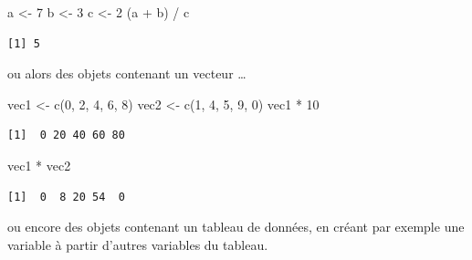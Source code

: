 \documentclass[
  letterpaper,
]{book}
\newenvironment{Shaded}{\begin{snugshade}}{\end{snugshade}}
\newcommand{\DecValTok}[1]{\textcolor[rgb]{0.68,0.00,0.00}{#1}}
\newcommand{\FunctionTok}[1]{\textcolor[rgb]{0.28,0.35,0.67}{#1}}
\newcommand{\NormalTok}[1]{\textcolor[rgb]{0.00,0.23,0.31}{#1}}
\newcommand{\OtherTok}[1]{\textcolor[rgb]{0.00,0.23,0.31}{#1}}
\newcommand{\SpecialCharTok}[1]{\textcolor[rgb]{0.37,0.37,0.37}{#1}}
\begin{document}
\begin{Shaded}
\begin{Highlighting}[]
\NormalTok{a }\OtherTok{\textless{}{-}} \DecValTok{7}
\NormalTok{b }\OtherTok{\textless{}{-}} \DecValTok{3}
\NormalTok{c }\OtherTok{\textless{}{-}} \DecValTok{2}
\NormalTok{(a }\SpecialCharTok{+}\NormalTok{ b) }\SpecialCharTok{/}\NormalTok{ c}
\end{Highlighting}
\end{Shaded}

\begin{verbatim}
[1] 5
\end{verbatim}

ou alors des objets contenant un vecteur \ldots{}

\begin{Shaded}
\begin{Highlighting}[]
\NormalTok{vec1 }\OtherTok{\textless{}{-}} \FunctionTok{c}\NormalTok{(}\DecValTok{0}\NormalTok{, }\DecValTok{2}\NormalTok{, }\DecValTok{4}\NormalTok{, }\DecValTok{6}\NormalTok{, }\DecValTok{8}\NormalTok{)}
\NormalTok{vec2 }\OtherTok{\textless{}{-}} \FunctionTok{c}\NormalTok{(}\DecValTok{1}\NormalTok{, }\DecValTok{4}\NormalTok{, }\DecValTok{5}\NormalTok{, }\DecValTok{9}\NormalTok{, }\DecValTok{0}\NormalTok{)}
\NormalTok{vec1 }\SpecialCharTok{*} \DecValTok{10}
\end{Highlighting}
\end{Shaded}

\begin{verbatim}
[1]  0 20 40 60 80
\end{verbatim}

\begin{Shaded}
\begin{Highlighting}[]
\NormalTok{vec1 }\SpecialCharTok{*}\NormalTok{ vec2}
\end{Highlighting}
\end{Shaded}

\begin{verbatim}
[1]  0  8 20 54  0
\end{verbatim}

ou encore des objets contenant un tableau de données, en créant par
exemple une variable à partir d'autres variables du tableau.

\begin{Shaded}
\end{Shaded}
\end{document}
